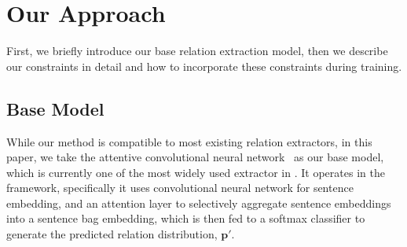 \section{Our Approach}
First, we briefly introduce our base relation extraction model, 
then we describe our constraints in detail and how to incorporate these constraints during training.




\subsection{Base Model}
\label{sec:base_model}
While our method is compatible to most existing relation extractors, in this paper, we take the attentive convolutional neural network~\cite{lin2016neural} as our base model, which is currently one of the most widely used extractor in \RE.
It operates in the \MIL framework, specifically
it uses convolutional neural network for sentence embedding, and an attention layer to selectively aggregate sentence embeddings into a sentence bag embedding, which is then fed to a softmax classifier to generate the predicted relation distribution, $\bm{p'}$. 



